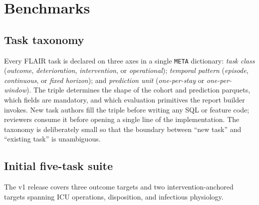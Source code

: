 \section{Benchmarks}
\label{sec:benchmarks}

\subsection*{Task taxonomy}

Every FLAIR task is declared on three axes in a single \texttt{META}
dictionary: \emph{task class} (\textit{outcome}, \textit{deterioration},
\textit{intervention}, or \textit{operational}); \emph{temporal
pattern} (\textit{episode}, \textit{continuous}, or \textit{fixed
horizon}); and \emph{prediction unit} (\textit{one-per-stay} or
\textit{one-per-window}). The
triple determines the shape of the cohort and prediction parquets,
which fields are mandatory, and which evaluation primitives the report
builder invokes. New task authors fill the triple before writing any
SQL or feature code; reviewers consume it before opening a single line
of the implementation. The taxonomy is deliberately small so that the
boundary between ``new task'' and ``existing task'' is unambiguous.

\subsection*{Initial five-task suite}

The v1 release covers three outcome targets and two
intervention-anchored targets spanning ICU operations, disposition,
and infectious physiology.

